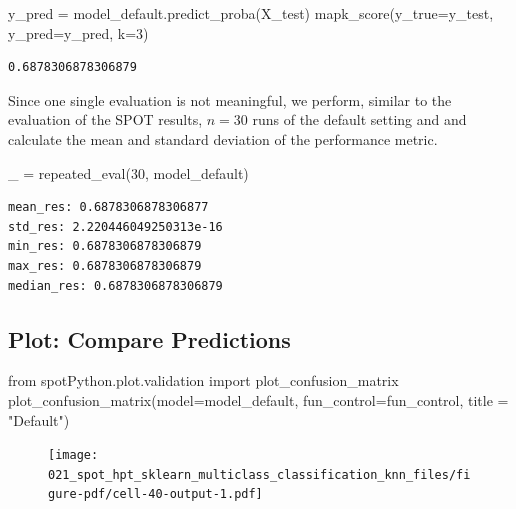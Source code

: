 \documentclass[
  letterpaper,
  DIV=11,
  numbers=noendperiod]{scrreprt}
\newenvironment{Shaded}{\begin{snugshade}}{\end{snugshade}}
\newcommand{\DecValTok}[1]{\textcolor[rgb]{0.68,0.00,0.00}{#1}}
\newcommand{\ImportTok}[1]{\textcolor[rgb]{0.00,0.46,0.62}{#1}}
\newcommand{\NormalTok}[1]{\textcolor[rgb]{0.00,0.23,0.31}{#1}}
\newcommand{\OperatorTok}[1]{\textcolor[rgb]{0.37,0.37,0.37}{#1}}
\newcommand{\StringTok}[1]{\textcolor[rgb]{0.13,0.47,0.30}{#1}}
\begin{document}
\begin{Shaded}
\begin{Highlighting}[]
\NormalTok{y\_pred }\OperatorTok{=}\NormalTok{ model\_default.predict\_proba(X\_test)}
\NormalTok{mapk\_score(y\_true}\OperatorTok{=}\NormalTok{y\_test, y\_pred}\OperatorTok{=}\NormalTok{y\_pred, k}\OperatorTok{=}\DecValTok{3}\NormalTok{)}
\end{Highlighting}
\end{Shaded}

\begin{verbatim}
0.6878306878306879
\end{verbatim}

Since one single evaluation is not meaningful, we perform, similar to
the evaluation of the SPOT results, \(n=30\) runs of the default setting
and and calculate the mean and standard deviation of the performance
metric.

\begin{Shaded}
\begin{Highlighting}[]
\NormalTok{\_ }\OperatorTok{=}\NormalTok{ repeated\_eval(}\DecValTok{30}\NormalTok{, model\_default)}
\end{Highlighting}
\end{Shaded}

\begin{verbatim}
mean_res: 0.6878306878306877
std_res: 2.220446049250313e-16
min_res: 0.6878306878306879
max_res: 0.6878306878306879
median_res: 0.6878306878306879
\end{verbatim}

\hypertarget{plot-compare-predictions-4}{%
\subsection{Plot: Compare
Predictions}\label{plot-compare-predictions-4}}

\begin{Shaded}
\begin{Highlighting}[]
\ImportTok{from}\NormalTok{ spotPython.plot.validation }\ImportTok{import}\NormalTok{ plot\_confusion\_matrix}
\NormalTok{plot\_confusion\_matrix(model}\OperatorTok{=}\NormalTok{model\_default, fun\_control}\OperatorTok{=}\NormalTok{fun\_control, title }\OperatorTok{=} \StringTok{"Default"}\NormalTok{)}
\end{Highlighting}
\end{Shaded}

\begin{figure}[H]

{\centering \texttt{[image: 021\_spot\_hpt\_sklearn\_multiclass\_classification\_knn\_files/figure-pdf/cell-40-output-1.pdf]}

}

\end{figure}
\end{document}

